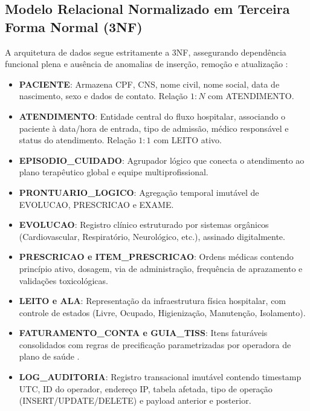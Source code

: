 \documentclass[12pt,oneside,a4paper,article]{abntex2}
\begin{document}
\subsection{Modelo Relacional Normalizado em Terceira Forma Normal (3NF)}
A arquitetura de dados segue estritamente a 3NF, assegurando dependência funcional plena e ausência de anomalias de inserção, remoção e atualização \cite{pressman:2016}:
\begin{itemize}[noitemsep]
  \item \textbf{PACIENTE}: Armazena CPF, CNS, nome civil, nome social, data de nascimento, sexo e dados de contato. Relação $1:N$ com ATENDIMENTO.
  \item \textbf{ATENDIMENTO}: Entidade central do fluxo hospitalar, associando o paciente à data/hora de entrada, tipo de admissão, médico responsável e status do atendimento. Relação $1:1$ com LEITO ativo.
  \item \textbf{EPISODIO\_CUIDADO}: Agrupador lógico que conecta o atendimento ao plano terapêutico global e equipe multiprofissional.
  \item \textbf{PRONTUARIO\_LOGICO}: Agregação temporal imutável de EVOLUCAO, PRESCRICAO e EXAME.
  \item \textbf{EVOLUCAO}: Registro clínico estruturado por sistemas orgânicos (Cardiovascular, Respiratório, Neurológico, etc.), assinado digitalmente.
  \item \textbf{PRESCRICAO e ITEM\_PRESCRICAO}: Ordens médicas contendo princípio ativo, dosagem, via de administração, frequência de aprazamento e validações toxicológicas.
  \item \textbf{LEITO e ALA}: Representação da infraestrutura física hospitalar, com controle de estados (Livre, Ocupado, Higienização, Manutenção, Isolamento).
  \item \textbf{FATURAMENTO\_CONTA e GUIA\_TISS}: Itens faturáveis consolidados com regras de precificação parametrizadas por operadora de plano de saúde \cite{ans_tiss:2023}.
  \item \textbf{LOG\_AUDITORIA}: Registro transacional imutável contendo timestamp UTC, ID do operador, endereço IP, tabela afetada, tipo de operação (INSERT/UPDATE/DELETE) e payload anterior e posterior.
\end{itemize}
\end{document}

